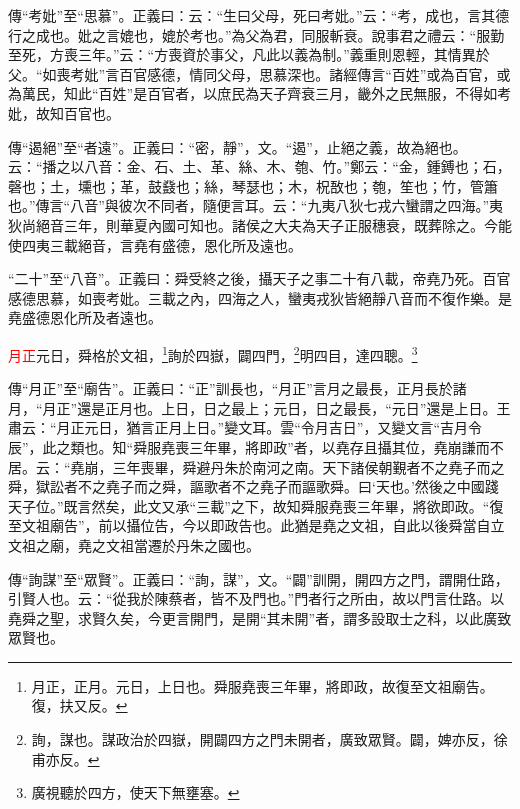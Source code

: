 {\noindent\zhuan{}\fzbyks 傳“考妣”至“思慕”。正義曰：云：“生曰父母，死曰考妣。”云：“考，成也，言其德行之成也。妣之言媲也，媲於考也。”為父為君，同服斬衰。說事君之禮云：“服勤至死，方喪三年。”云：“方喪資於事父，凡此以義為制。”義重則恩輕，其情異於父。“如喪考妣”言百官感德，情同父母，思慕深也。諸經傳言“百姓”或為百官，或為萬民，知此“百姓”是百官者，以庶民為天子齊衰三月，畿外之民無服，不得如考妣，故知百官也。 \par}

{\noindent\zhuan{}\fzbyks 傳“遏絕”至“者遠”。正義曰：“密，靜”，文。“遏”，止絕之義，故為絕也。云：“播之以八音：金、石、土、革、絲、木、匏、竹。”鄭云：“金，鍾鎛也；石，磬也；土，壎也；革，鼓鼗也；絲，琴瑟也；木，柷敔也；匏，笙也；竹，管簫也。”傳言“八音”與彼次不同者，隨便言耳。云：“九夷八狄七戎六蠻謂之四海。”夷狄尚絕音三年，則華夏內國可知也。諸侯之大夫為天子正服穗衰，既葬除之。今能使四夷三載絕音，言堯有盛德，恩化所及遠也。 \par}

{\noindent\shu{}\fzkt “二十”至“八音”。正義曰：舜受終之後，攝天子之事二十有八載，帝堯乃死。百官感德思慕，如喪考妣。三載之內，四海之人，蠻夷戎狄皆絕靜八音而不復作樂。是堯盛德恩化所及者遠也。 \par}

\textcolor{red}{月正}元日，舜格於文祖，\footnote{月正，正月。元日，上日也。舜服堯喪三年畢，將即政，故復至文祖廟告。復，扶又反。}詢於四嶽，闢四門，\footnote{詢，謀也。謀政治於四嶽，開闢四方之門未開者，廣致眾賢。闢，婢亦反，徐甫亦反。}明四目，達四聰。\footnote{廣視聽於四方，使天下無壅塞。}

{\noindent\zhuan{}\fzbyks 傳“月正”至“廟告”。正義曰：“正”訓長也，“月正”言月之最長，正月長於諸月，“月正”還是正月也。上日，日之最上；元日，日之最長，“元日”還是上日。王肅云：“月正元日，猶言正月上日。”變文耳。雲“令月吉日”，又變文言“吉月令辰”，此之類也。知“舜服堯喪三年畢，將即政”者，以堯存且攝其位，堯崩謙而不居。云：“堯崩，三年喪畢，舜避丹朱於南河之南。天下諸侯朝覲者不之堯子而之舜，獄訟者不之堯子而之舜，謳歌者不之堯子而謳歌舜。曰‘天也。’然後之中國踐天子位。”既言然矣，此文又承“三載”之下，故知舜服堯喪三年畢，將欲即政。“復至文祖廟告”，前以攝位告，今以即政告也。此猶是堯之文祖，自此以後舜當自立文祖之廟，堯之文祖當遷於丹朱之國也。 \par}

{\noindent\zhuan{}\fzbyks 傳“詢謀”至“眾賢”。正義曰：“詢，謀”，文。“闢”訓開，開四方之門，謂開仕路，引賢人也。云：“從我於陳蔡者，皆不及門也。”門者行之所由，故以門言仕路。以堯舜之聖，求賢久矣，今更言開門，是開“其未開”者，謂多設取士之科，以此廣致眾賢也。 \par}

